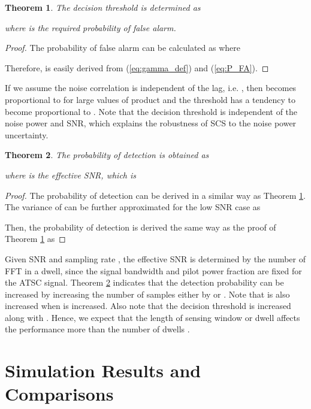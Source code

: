 \documentclass[draftclsnofoot,onecolumn,12pt]{IEEEtran}
\newtheorem{theorem}{Theorem}\newtheorem{lemma}{Lemma}
\begin{document}
\begin{theorem}
  \label{thm:gamma}
  The decision threshold  is determined as

where  is the required probability of false alarm.
\end{theorem}

\begin{proof}
The probability of false alarm  can be calculated as 
where 

Therefore,  is easily derived from (\ref{eq:gamma_def}) and (\ref{eq:P_FA}).
\end{proof}


If we assume the noise correlation is independent of the lag, i.e. , then  becomes proportional to  for large values of  product and the threshold  has a tendency to become proportional to . Note that the decision threshold is independent of the noise power and SNR, which explains the robustness of SCS to the noise power uncertainty.

\begin{theorem}
  \label{thm:P_D}
The probability of detection is obtained as

where  is the effective SNR, which is


\end{theorem}

\begin{proof}
The probability of detection can be derived in a similar way as Theorem \ref{thm:gamma}.
The variance of  can be further approximated for the low SNR case as


Then, the probability of detection is derived the same way as the proof of Theorem \ref{thm:gamma} as

\end{proof}

Given SNR and sampling rate , the effective SNR is determined by the number of FFT  in a dwell, since the signal bandwidth  and pilot power fraction  are fixed for the ATSC signal.
Theorem \ref{thm:P_D} indicates
that the detection probability  can be increased by increasing the number of samples either by  or . Note that  is also increased when  is increased. Also note that the decision threshold  is increased along with .
Hence, we expect that the length of sensing window or dwell  affects the performance more than the number of dwells .





\section{Simulation Results and Comparisons} \label{sec:SimResults}
\end{document}
